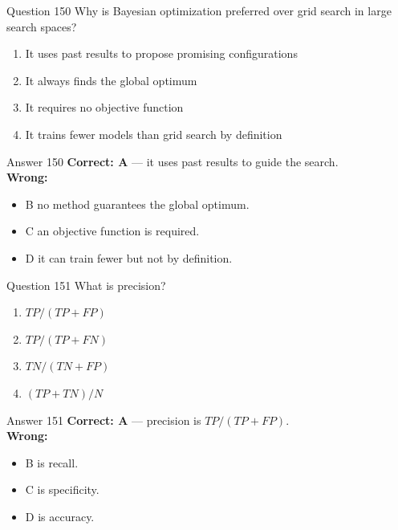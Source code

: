 \documentclass[aspectratio=169,11pt]{beamer}
\begin{document}
	\begin{frame}{Question 150}
		Why is Bayesian optimization preferred over grid search in large search spaces?
		\begin{enumerate}[label=\Alph*.]
			\item It uses past results to propose promising configurations
			\item It always finds the global optimum
			\item It requires no objective function
			\item It trains fewer models than grid search by definition
		\end{enumerate}
	\end{frame}
	\begin{frame}{Answer 150}
		\textbf{Correct: A} --- it uses past results to guide the search.\\
		\vspace{0.5em}
		\textbf{Wrong:}
		\begin{itemize}
			\item B no method guarantees the global optimum.
			\item C an objective function is required.
			\item D it can train fewer but not by definition.
		\end{itemize}
	\end{frame}
	
	\begin{frame}{Question 151}
		What is precision?
		\begin{enumerate}[label=\Alph*.]
			\item $TP/(TP+FP)$
			\item $TP/(TP+FN)$
			\item $TN/(TN+FP)$
			\item $(TP+TN)/N$
		\end{enumerate}
	\end{frame}
	\begin{frame}{Answer 151}
		\textbf{Correct: A} --- precision is $TP/(TP+FP)$.\\
		\vspace{0.5em}
		\textbf{Wrong:}
		\begin{itemize}
			\item B is recall.
			\item C is specificity.
			\item D is accuracy.
		\end{itemize}
	\end{frame}
	
\end{document}
